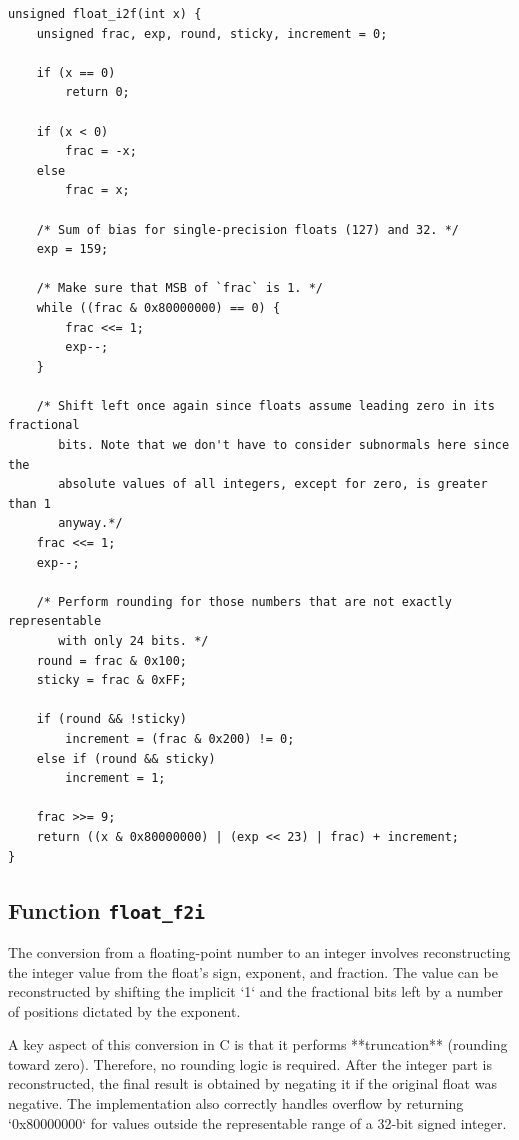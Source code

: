 \documentclass{article}
\begin{document}
\begin{verbatim}
unsigned float_i2f(int x) {
    unsigned frac, exp, round, sticky, increment = 0;

    if (x == 0)
        return 0;

    if (x < 0)
        frac = -x;
    else
        frac = x;

    /* Sum of bias for single-precision floats (127) and 32. */
    exp = 159;

    /* Make sure that MSB of `frac` is 1. */
    while ((frac & 0x80000000) == 0) {
        frac <<= 1;
        exp--;
    }

    /* Shift left once again since floats assume leading zero in its fractional
       bits. Note that we don't have to consider subnormals here since the
       absolute values of all integers, except for zero, is greater than 1
       anyway.*/
    frac <<= 1;
    exp--;

    /* Perform rounding for those numbers that are not exactly representable
       with only 24 bits. */
    round = frac & 0x100;
    sticky = frac & 0xFF;

    if (round && !sticky)
        increment = (frac & 0x200) != 0;
    else if (round && sticky)
        increment = 1;

    frac >>= 9;
    return ((x & 0x80000000) | (exp << 23) | frac) + increment;
}
\end{verbatim}

\subsection{Function \texttt{float\_f2i}}

The conversion from a floating-point number to an integer involves 
reconstructing the integer value from the float's sign, exponent, and fraction. 
The value can be reconstructed by shifting the implicit `1` and the fractional 
bits left by a number of positions dictated by the exponent.

A key aspect of this conversion in C is that it performs **truncation** 
(rounding toward zero). Therefore, no rounding logic is required. After the 
integer part is reconstructed, the final result is obtained by negating it if 
the original float was negative. The implementation also correctly handles 
overflow by returning `0x80000000` for values outside the representable range of 
a 32-bit signed integer.
\end{document}
